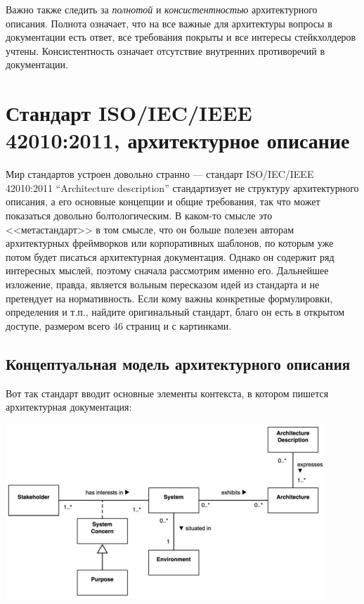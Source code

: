 \documentclass[a5paper]{article}
\begin{document}
Важно также следить за \emph{полнотой} и \emph{консистентностью} архитектурного описания. Полнота означает, что на все важные для архитектуры вопросы в документации есть ответ, все требования покрыты и все интересы стейкхолдеров учтены. Консистентность означает отсутствие внутренних противоречий в документации.

\section{Стандарт ISO/IEC/IEEE 42010:2011, архитектурное описание}

Мир стандартов устроен довольно странно --- стандарт ISO/IEC/IEEE 42010:2011 ``Architecture description'' стандартизует не структуру архитектурного описания, а его основные концепции и общие требования, так что может показаться довольно болтологическим. В каком-то смысле это <<метастандарт>> в том смысле, что он больше полезен авторам архитектурных фреймворков или корпоративных шаблонов, по которым уже потом будет писаться архитектурная документация. Однако он содержит ряд интересных мыслей, поэтому сначала рассмотрим именно его. Дальнейшее изложение, правда, является вольным пересказом идей из стандарта и не претендует на нормативность. Если кому важны конкретные формулировки, определения и т.п., найдите оригинальный стандарт, благо он есть в открытом доступе, размером всего 46 страниц и с картинками.

\subsection{Концептуальная модель архитектурного описания}

Вот так стандарт вводит основные элементы контекста, в котором пишется архитектурная документация:

\begin{center}
    \includegraphics[width=0.9\textwidth]{ieee42010Context.png}
\end{center}
\end{document}
